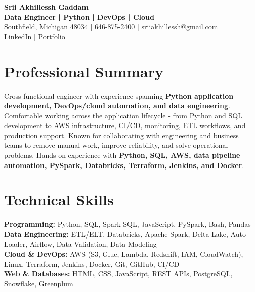 \documentclass[letterpaper,10pt]{article}
\begin{document}
\fontsize{9.35pt}{10.45pt}\selectfont

\begin{center}
    {\LARGE \textbf{Srii Akhillessh Gaddam}} \\[-1pt]
    \textbf{Data Engineer | Python | DevOps | Cloud} \\[2pt]
    Southfield, Michigan 48034 $|$
    \href{tel:6468752400}{646-875-2400} $|$
    \href{mailto:sriiakhillessh@gmail.com}{sriiakhillessh@gmail.com} \\[1pt]
    \href{https://www.linkedin.com/in/srii-akhiilessh-gaddam-b48668191/}{LinkedIn} $|$
    \href{https://sriiakhillesshg.github.io/portfolio/}{Portfolio}
\end{center}
\vspace{-8pt}

\section{Professional Summary}
\small{Cross-functional engineer with experience spanning \textbf{Python application development, DevOps/cloud automation, and data engineering}. Comfortable working across the application lifecycle - from Python and SQL development to AWS infrastructure, CI/CD, monitoring, ETL workflows, and production support. Known for collaborating with engineering and business teams to remove manual work, improve reliability, and solve operational problems. Hands-on experience with \textbf{Python, SQL, AWS, data pipeline automation, PySpark, Databricks, Terraform, Jenkins, and Docker}.}

\section{Technical Skills}
\small{
\textbf{Programming:} Python, SQL, Spark SQL, JavaScript, PySpark, Bash, Pandas \\
\textbf{Data Engineering:} ETL/ELT, Databricks, Apache Spark, Delta Lake, Auto Loader, Airflow, Data Validation, Data Modeling \\
\textbf{Cloud \& DevOps:} AWS (S3, Glue, Lambda, Redshift, IAM, CloudWatch), Linux, Terraform, Jenkins, Docker, Git, GitHub, CI/CD \\
\textbf{Web \& Databases:} HTML, CSS, JavaScript, REST APIs, PostgreSQL, Snowflake, Greenplum
}

\end{document}
